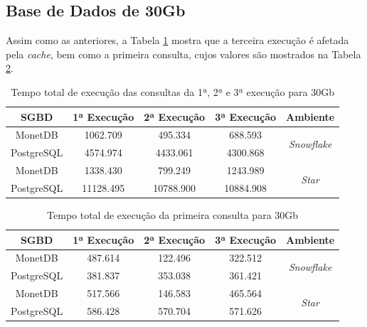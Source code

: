 \subsection{Base de Dados de 30Gb}

Assim como as anteriores, a Tabela \ref{tab:queries_cache_30} mostra que a terceira execução é afetada pela \textit{cache}, bem como a primeira consulta, cujos valores são mostrados na Tabela \ref{tab:q1_cache_30}.

\begin{table}[htpb]
        \centering
        \caption{Tempo total de execução das consultas da 1ª, 2ª e 3ª execução para 30Gb}
        \label{tab:queries_cache_30}
        \begin{tabular}{|c|c|c|c|c|}
        \hline
        SGBD       & 1ª Execução & 2ª Execução & 3ª Execução & Ambiente                            \\ \hline
        MonetDB    & 1062.709    & 495.334     & 688.593     & \multirow{2}{*}{\textit{Snowflake}} \\ \cline{1-4}
        PostgreSQL & 4574.974    & 4433.061    & 4300.868    &                                     \\ \hline
        MonetDB    & 1338.430    & 799.249     & 1243.989    & \multirow{2}{*}{\textit{Star}}      \\ \cline{1-4}
        PostgreSQL & 11128.495   & 10788.900   & 10884.908   &                                     \\ \hline
        \end{tabular}
\end{table}

\begin{table}[htpb]
        \centering
        \caption{Tempo total de execução da primeira consulta para 30Gb}
        \label{tab:q1_cache_30}
        \begin{tabular}{|c|c|c|c|c|}
        \hline
        SGBD       & 1ª Execução & 2ª Execução & 3ª Execução & Ambiente                            \\ \hline
        MonetDB    & 487.614     & 122.496     & 322.512     & \multirow{2}{*}{\textit{Snowflake}} \\ \cline{1-4}
        PostgreSQL & 381.837     & 353.038     & 361.421     &                                     \\ \hline
        MonetDB    & 517.566     & 146.583     & 465.564     & \multirow{2}{*}{\textit{Star}}      \\ \cline{1-4}
        PostgreSQL & 586.428     & 570.704     & 571.626     &                                     \\ \hline
        \end{tabular}
\end{table}


